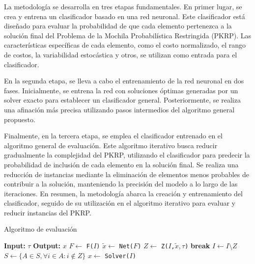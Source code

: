 \documentclass[spanish, a4paper, 12pt, openany,final]{book}
\begin{document}
La metodología se desarrolla en tres etapas fundamentales. En primer lugar, se crea y entrena un clasificador basado en una red neuronal. Este clasificador está diseñado para evaluar la probabilidad de que cada elemento pertenezca a la solución final del Problema de la Mochila Probabilística Restringida (PKRP). Las características específicas de cada elemento, como el costo normalizado, el rango de costos, la variabilidad estocástica y otros, se utilizan como entrada para el clasificador.

En la segunda etapa, se lleva a cabo el entrenamiento de la red neuronal en dos fases. Inicialmente, se entrena la red con soluciones óptimas generadas por un solver exacto para establecer un clasificador general. Posteriormente, se realiza una afinación más precisa utilizando pasos intermedios del algoritmo general propuesto.

Finalmente, en la tercera etapa, se emplea el clasificador entrenado en el algoritmo general de evaluación. Este algoritmo iterativo busca reducir gradualmente la complejidad del PKRP, utilizando el clasificador para predecir la probabilidad de inclusión de cada elemento en la solución final. Se realiza una reducción de instancias mediante la eliminación de elementos menos probables de contribuir a la solución, manteniendo la precisión del modelo a lo largo de las iteraciones. En resumen, la metodología abarca la creación y entrenamiento del clasificador, seguido de su utilización en el algoritmo iterativo para evaluar y reducir instancias del PKRP.



\begin{algorithm}[H]
	\caption{Algoritmo de evaluación}\label{alg:general}
	\begin{algorithmic}[1]
		\Statex \textbf{Input:} $\tau$
		\Statex \textbf{Output:} $x$
		\Loop
		\State $F \gets$ \texttt{F($I$)}\label{alg1:full_features}
		\State $\tilde{x} \gets$ \texttt{Net($F$)} \label{alg1:get_pred}
		\State $Z \gets$ \texttt{Z($I$,$\tilde{x},\tau$)} \label{alg1:get_Z}
		 \label{alg1:break_condition}
		\State \textbf{break}
		\EndIf
		\State $I \gets I\setminus Z$ 								\label{alg1:update_I}
		\State $S \gets \{A \in S, \forall i \in A: i \notin Z\}$  \label{alg1:update_S}
		\EndLoop
		\State $x \gets$ \texttt{Solver($I$)} \label{alg1:exact_solver} 
	\end{algorithmic}
\end{algorithm}
\end{document}
